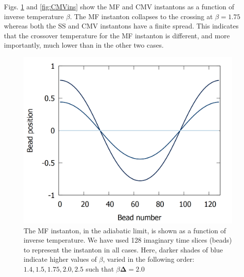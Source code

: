 \documentclass[%
 aip,
 jmp,%
 amsmath,amssymb,
reprint,%
]{revtex4-1}
\begin{document}
Figs. \ref{fig:MFins} and \ref{fig:CMVins} show the MF and CMV instantons as a function of inverse temperature $\beta$. The MF instanton collapses to the crossing at $\beta=1.75$ whereas both the SS and CMV instantons have a finite spread. This indicates that the crossover temperature for the MF instanton is different, and more importantly, much lower than in the other two cases. 
\begin{figure}[ht!]
\centering
\includegraphics[scale=0.16]{MFadia-instanton-lines.png}
\caption{The MF instanton, in the adiabatic limit, is shown as a function of inverse temperature. We have used 128 imaginary time slices (beads) to represent the instanton in all cases. Here, darker shades of blue indicate higher values of $\beta$, varied in the following order: $1.4, 1.5, 1.75, 2.0, 2.5$ such that $\beta\mathbf{\Delta}=2.0$ } \label{fig:MFins}
\end{figure}
\end{document}
